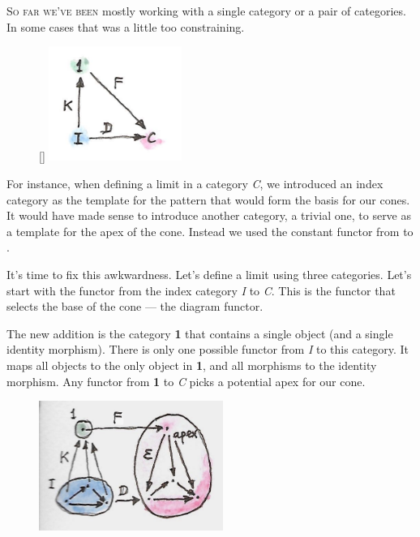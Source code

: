 \lettrine[lhang=0.17]{S}{o far we've been} mostly working with a single category or a pair of
categories. In some cases that was a little too constraining.

\begin{figure}
\raisebox{0pt}[\dimexpr{}\baselineskip\relax]{
\includegraphics[width=1.70833in]{images/kan2.jpg}}%
\end{figure}

For instance, when defining a limit in a category \emph{C}, we introduced an
index category  as the template for the pattern that would
form the basis for our cones. It would have made sense to introduce
another category, a trivial one, to serve as a template for the apex of
the cone. Instead we used the constant functor  from
 to .

It's time to fix this awkwardness. Let's define a limit using three
categories. Let's start with the functor  from the index
category \emph{I} to \emph{C}. This is the functor that selects the base
of the cone --- the diagram functor.

The new addition is the category \textbf{1} that contains a single
object (and a single identity morphism). There is only one possible
functor  from \emph{I} to this category. It maps all objects
to the only object in \textbf{1}, and all morphisms to the identity
morphism. Any functor  from \textbf{1} to \emph{C} picks a
potential apex for our cone.

\begin{figure}[H]
\centering
\includegraphics[width=60mm]{images/kan15.jpg}
\end{figure}

